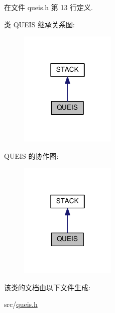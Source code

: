 在文件 queis.\+h 第 13 行定义.



类 Q\+U\+E\+IS 继承关系图\+:\nopagebreak
\begin{figure}[H]
\begin{center}
\leavevmode
\includegraphics[width=130pt]{classQUEIS__inherit__graph}
\end{center}
\end{figure}


Q\+U\+E\+IS 的协作图\+:\nopagebreak
\begin{figure}[H]
\begin{center}
\leavevmode
\includegraphics[width=130pt]{classQUEIS__coll__graph}
\end{center}
\end{figure}


该类的文档由以下文件生成\+:\begin{DoxyCompactItemize}
\item 
src/\hyperlink{queis_8h}{queis.\+h}\end{DoxyCompactItemize}
